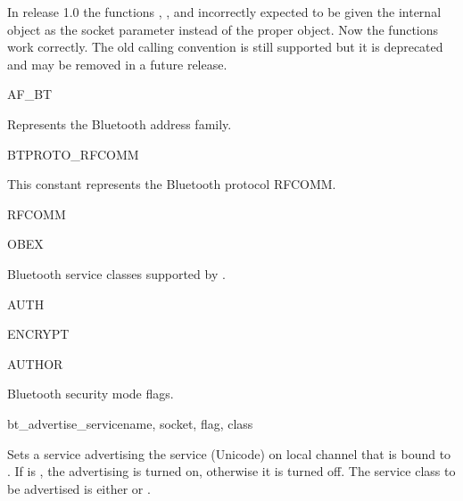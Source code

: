\begin{notice}[note]
In release 1.0 the functions , 
, and 
 incorrectly 
expected to be given the internal  object as the 
socket parameter instead of the proper  object. Now the 
functions work correctly. The old calling convention is still supported but 
it is deprecated and may be removed in a future release.
\end{notice}

\begin{datadesc}{AF_BT}

Represents the Bluetooth address family.

\end{datadesc}

\begin{datadesc}{BTPROTO_RFCOMM}

This constant represents the Bluetooth protocol RFCOMM.

\end{datadesc}

\begin{datadesc}{RFCOMM}
\end{datadesc}
\begin{datadesc}{OBEX}

Bluetooth service classes supported by .

\end{datadesc}

\begin{datadesc}{AUTH}
\end{datadesc}
\begin{datadesc}{ENCRYPT}
\end{datadesc}
\begin{datadesc}{AUTHOR}

Bluetooth security mode flags.

\end{datadesc}

\begin{funcdesc}{bt_advertise_service}{name, socket, flag, class}

Sets a service advertising the service  (Unicode) on local channel 
that is bound to . If  is , the advertising is 
turned on, otherwise it is turned off. The service class to be advertised is 
either  or .

\end{funcdesc}

